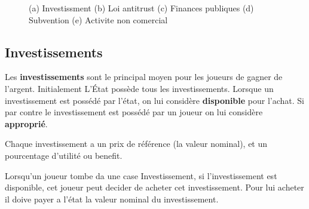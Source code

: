 \documentclass[12pt]{article}
\begin{document}
    \begin{figure}
    \centering

   
    \caption{(a) Investissment (b) Loi antitrust (c) Finances publiques (d) Subvention (e) Activite non comercial}
    \label{fig:foobar}
\end{figure}



    \subsection{Investissements}
	Les \textbf{investissements} sont le principal moyen pour les joueurs de gagner de l'argent. 
	Initialement L'\'Etat possède tous les investissements.
	Lorsque un investissement est possédé par l'état, on lui considère \textbf{disponible} pour l'achat. 
	Si par contre le investissement est possédé par un joueur on lui considère \textbf{approprié}.
	
	Chaque investissement a un prix de référence (la valeur nominal),  et un pourcentage d'utilité ou benefit.
	
	Lorsqu'un joueur tombe da une case Investissement, si l'investissement est disponible, cet joueur peut decider de acheter cet investissement. 
	Pour lui acheter il doive payer a l'état la valeur nominal du investissement. 
	
\end{document}
